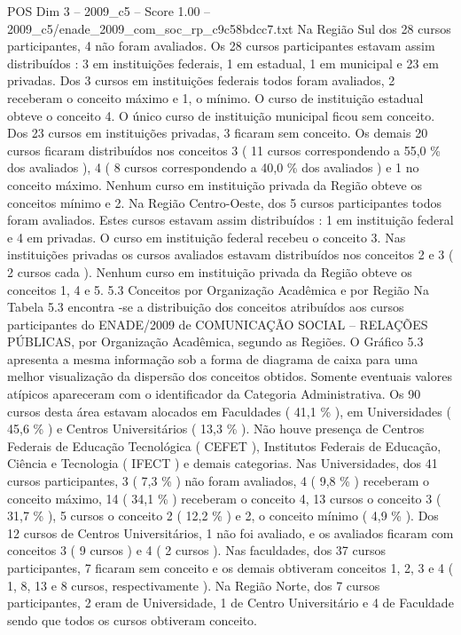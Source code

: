 \begin{textsample}{POS Dim 3 – 2009\_c5 – Score 1.00 – 2009\_c5/enade\_2009\_com\_soc\_rp\_c9c58bdcc7.txt}
Na Região Sul dos 28 cursos participantes, 4 não foram avaliados.
Os 28 cursos participantes estavam assim distribuídos : 3 em instituições federais, 1 em estadual, 1 em municipal e 23 em privadas.
Dos 3 cursos em instituições federais todos foram avaliados, 2 receberam o conceito máximo e 1, o mínimo.
O curso de instituição estadual obteve o conceito 4.
O único curso de instituição municipal ficou sem conceito.
Dos 23 cursos em instituições privadas, 3 ficaram sem conceito.
Os demais 20 cursos ficaram distribuídos nos conceitos 3 ( 11 cursos correspondendo a 55,0 \% dos avaliados ), 4 ( 8 cursos correspondendo a 40,0 \% dos avaliados ) e 1 no conceito máximo.
Nenhum curso em instituição privada da Região obteve os conceitos mínimo e 2.
Na Região Centro-Oeste, dos 5 cursos participantes todos foram avaliados.
Estes cursos estavam assim distribuídos : 1 em instituição federal e 4 em privadas.
O curso em instituição federal recebeu o conceito 3.
Nas instituições privadas os cursos avaliados estavam distribuídos nos conceitos 2 e 3 ( 2 cursos cada ).
Nenhum curso em instituição privada da Região obteve os conceitos 1, 4 e 5. 5.3 Conceitos por Organização Acadêmica e por Região Na Tabela 5.3 encontra -se a distribuição dos conceitos atribuídos aos cursos participantes do ENADE/2009 de COMUNICAÇÃO SOCIAL – RELAÇÕES PÚBLICAS, por Organização Acadêmica, segundo as Regiões.
O Gráfico 5.3 apresenta a mesma informação sob a forma de diagrama de caixa para uma melhor visualização da dispersão dos conceitos obtidos.
Somente eventuais valores atípicos apareceram com o identificador da Categoria Administrativa.
Os 90 cursos desta área estavam alocados em Faculdades ( 41,1 \% ), em Universidades ( 45,6 \% ) e Centros Universitários ( 13,3 \% ).
Não houve presença de Centros Federais de Educação Tecnológica ( CEFET ), Institutos Federais de Educação, Ciência e Tecnologia ( IFECT ) e demais categorias.
Nas Universidades, dos 41 cursos participantes, 3 ( 7,3 \% ) não foram avaliados, 4 ( 9,8 \% ) receberam o conceito máximo, 14 ( 34,1 \% ) receberam o conceito 4, 13 cursos o conceito 3 ( 31,7 \% ), 5 cursos o conceito 2 ( 12,2 \% ) e 2, o conceito mínimo ( 4,9 \% ).
Dos 12 cursos de Centros Universitários, 1 não foi avaliado, e os avaliados ficaram com conceitos 3 ( 9 cursos ) e 4 ( 2 cursos ).
Nas faculdades, dos 37 cursos participantes, 7 ficaram sem conceito e os demais obtiveram conceitos 1, 2, 3 e 4 ( 1, 8, 13 e 8 cursos, respectivamente ).
Na Região Norte, dos 7 cursos participantes, 2 eram de Universidade, 1 de Centro Universitário e 4 de Faculdade sendo que todos os cursos obtiveram conceito.

\end{textsample}
